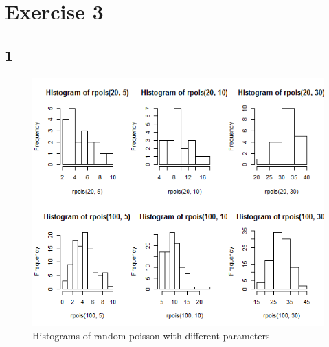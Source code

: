 \documentclass{article}
\begin{document}
  \section*{Exercise 3}
    \subsection*{1}
      \begin{figure}[H]
          \centering
          \includegraphics[scale=0.3]{../results/3_1.png}
          \caption{Histograms of random poisson with different parameters}
          \label{fig:Hist3_1}
      \end{figure}
\end{document}
